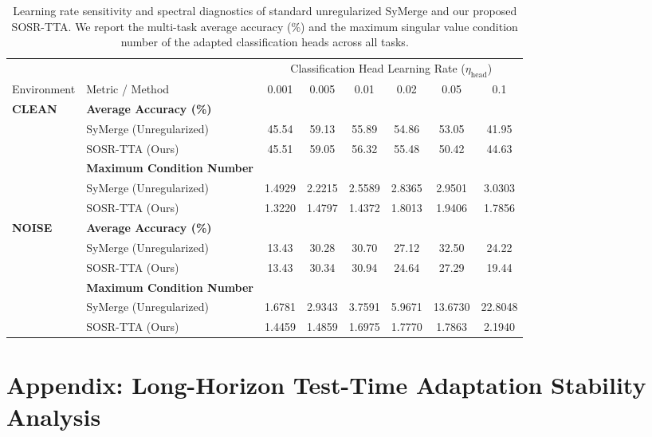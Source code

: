 \documentclass{article}
\theoremstyle{plain}
\theoremstyle{definition}
\theoremstyle{remark}
\begin{document}
\begin{table}[htbp]
\caption{Learning rate sensitivity and spectral diagnostics of standard unregularized SyMerge and our proposed SOSR-TTA. We report the multi-task average accuracy (\%) and the maximum singular value condition number of the adapted classification heads across all tasks.}
\label{tab:lr_sweep_results}
\vskip 0.15in
\begin{center}
\begin{small}
\begin{tabular}{llcccccc}
\toprule
& & \multicolumn{6}{c}{Classification Head Learning Rate ($\eta_{\text{head}}$)} \\
\cmidrule{3-8}
Environment & Metric / Method & 0.001 & 0.005 & 0.01 & 0.02 & 0.05 & 0.1 \\
\midrule
\textbf{CLEAN} & \textbf{Average Accuracy (\%)} & & & & & & \\
 & \quad SyMerge (Unregularized) & 45.54 & 59.13 & 55.89 & 54.86 & 53.05 & 41.95 \\
 & \quad SOSR-TTA (Ours) & 45.51 & 59.05 & 56.32 & 55.48 & 50.42 & 44.63 \\
\cmidrule{2-8}
 & \textbf{Maximum Condition Number} & & & & & & \\
 & \quad SyMerge (Unregularized) & 1.4929 & 2.2215 & 2.5589 & 2.8365 & 2.9501 & 3.0303 \\
 & \quad SOSR-TTA (Ours) & 1.3220 & 1.4797 & 1.4372 & 1.8013 & 1.9406 & 1.7856 \\
\midrule
\textbf{NOISE} & \textbf{Average Accuracy (\%)} & & & & & & \\
 & \quad SyMerge (Unregularized) & 13.43 & 30.28 & 30.70 & 27.12 & 32.50 & 24.22 \\
 & \quad SOSR-TTA (Ours) & 13.43 & 30.34 & 30.94 & 24.64 & 27.29 & 19.44 \\
\cmidrule{2-8}
 & \textbf{Maximum Condition Number} & & & & & & \\
 & \quad SyMerge (Unregularized) & 1.6781 & 2.9343 & 3.7591 & 5.9671 & 13.6730 & 22.8048 \\
 & \quad SOSR-TTA (Ours) & 1.4459 & 1.4859 & 1.6975 & 1.7770 & 1.7863 & 2.1940 \\
\bottomrule
\end{tabular}
\end{small}
\end{center}
\vskip -0.1in
\end{table}

\section{Appendix: Long-Horizon Test-Time Adaptation Stability Analysis}
\label{appendix:horizon_stability}
\end{document}
